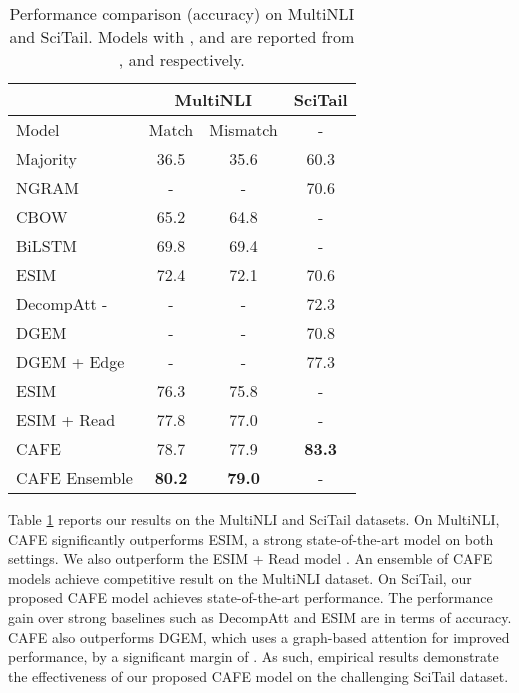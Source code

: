 \documentclass[11pt,a4paper]{article}
\begin{document}
\begin{table}[htbp]
  \centering
\small
    \begin{tabular}{|l|cc|c|}
    \hline
    & \multicolumn{2}{c}{MultiNLI} & SciTail \\
    \hline
    Model & \multicolumn{1}{l}{Match} & \multicolumn{1}{|l|}{Mismatch} & - \\
    \hline
    Majority & 36.5 & 35.6 & 60.3 \\
    NGRAM & - & - & 70.6 \\
CBOW & 65.2 & 64.8 & - \\
    BiLSTM  & 69.8 & 69.4 & -\\
    \hline
     ESIM & 72.4  & 72.1 & 70.6 \\
    DecompAtt - & - & - &72.3\\
    DGEM & - & - &70.8 \\
    DGEM + Edge & -  & - &77.3 \\
   \hline
    ESIM  & 76.3  & 75.8 & -\\
    ESIM + Read  & 77.8 & 77.0 & - \\
    \hline
    \textsc{CAFE} & 78.7  & 77.9 & \textbf{83.3} \\
    CAFE Ensemble & \textbf{80.2}& \textbf{79.0} & - \\
    \hline
    \end{tabular}\caption{Performance comparison (accuracy) on MultiNLI and SciTail. Models with ,  and  are reported from \cite{DBLP:journals/corr/Weissenborn17}, \cite{scitail} and \cite{DBLP:journals/corr/WilliamsNB17} respectively.}\label{multinli_results}
\end{table}

Table \ref{multinli_results} reports our results on the MultiNLI and SciTail datasets. On MultiNLI, CAFE significantly outperforms ESIM, a strong state-of-the-art model on both settings. We also outperform the ESIM + Read model \cite{DBLP:journals/corr/Weissenborn17}. An ensemble of CAFE models achieve competitive result on the MultiNLI dataset. On SciTail, our proposed CAFE model achieves state-of-the-art performance. The performance gain over strong baselines such as DecompAtt and ESIM are  in terms of accuracy. CAFE also outperforms DGEM, which uses a graph-based attention for improved performance, by a significant margin of . As such, empirical results demonstrate the effectiveness of our proposed CAFE model on the challenging SciTail dataset.
\end{document}
